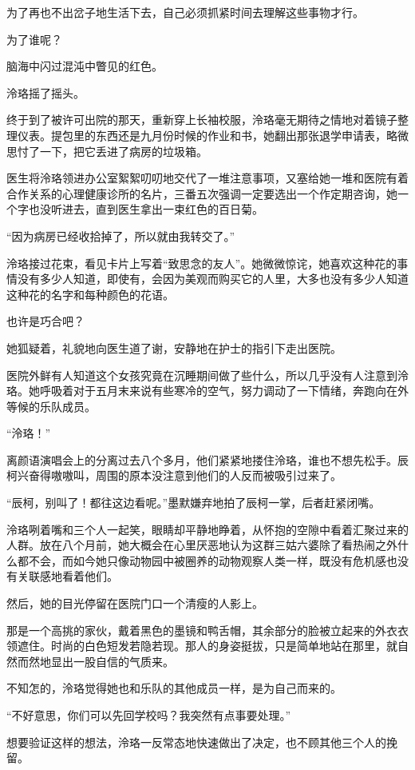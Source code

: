 \documentclass[UTF8, scheme = chinese, openany]{ctexbook}
\begin{document}
为了再也不出岔子地生活下去，自己必须抓紧时间去理解这些事物才行。

为了谁呢？

脑海中闪过混沌中瞥见的红色。

泠珞摇了摇头。

终于到了被许可出院的那天，重新穿上长袖校服，泠珞毫无期待之情地对着镜子整理仪表。提包里的东西还是九月份时候的作业和书，她翻出那张退学申请表，略微思忖了一下，把它丢进了病房的垃圾箱。

医生将泠珞领进办公室絮絮叨叨地交代了一堆注意事项，又塞给她一堆和医院有着合作关系的心理健康诊所的名片，三番五次强调一定要选出一个作定期咨询，她一个字也没听进去，直到医生拿出一束红色的百日菊。

“因为病房已经收拾掉了，所以就由我转交了。”

泠珞接过花束，看见卡片上写着“致思念的友人”。她微微惊诧，她喜欢这种花的事情没有多少人知道，即使有，会因为美观而购买它的人里，大多也没有多少人知道这种花的名字和每种颜色的花语。

也许是巧合吧？

她狐疑着，礼貌地向医生道了谢，安静地在护士的指引下走出医院。

医院外鲜有人知道这个女孩究竟在沉睡期间做了些什么，所以几乎没有人注意到泠珞。她呼吸着对于五月末来说有些寒冷的空气，努力调动了一下情绪，奔跑向在外等候的乐队成员。

“泠珞！”

离颜语演唱会上的分离过去八个多月，他们紧紧地搂住泠珞，谁也不想先松手。辰柯兴奋得嗷嗷叫，周围的原本没注意到他们的人反而被吸引过来了。

“辰柯，别叫了！都往这边看呢。”墨默嫌弃地拍了辰柯一掌，后者赶紧闭嘴。

泠珞咧着嘴和三个人一起笑，眼睛却平静地睁着，从怀抱的空隙中看着汇聚过来的人群。放在八个月前，她大概会在心里厌恶地认为这群三姑六婆除了看热闹之外什么都不会，而如今她只像动物园中被圈养的动物观察人类一样，既没有危机感也没有关联感地看着他们。

然后，她的目光停留在医院门口一个清瘦的人影上。

那是一个高挑的家伙，戴着黑色的墨镜和鸭舌帽，其余部分的脸被立起来的外衣衣领遮住。时尚的白色短发若隐若现。那人的身姿挺拔，只是简单地站在那里，就自然而然地显出一股自信的气质来。

不知怎的，泠珞觉得她也和乐队的其他成员一样，是为自己而来的。

“不好意思，你们可以先回学校吗？我突然有点事要处理。”

想要验证这样的想法，泠珞一反常态地快速做出了决定，也不顾其他三个人的挽留。
\end{document}
